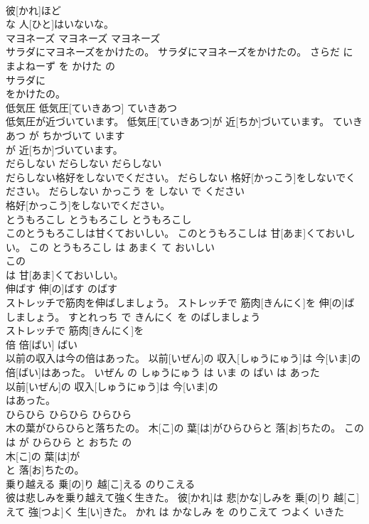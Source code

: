 \documentclass[8pt]{extreport}
\begin{document}
\begin{CJK}{UTF8}{min}
\\	彼[かれ]ほど
\\	な 人[ひと]はいないな。			
\\	マヨネーズ	マヨネーズ	マヨネーズ	
\\	サラダにマヨネーズをかけたの。	サラダにマヨネーズをかけたの。	さらだ に まよねーず を かけた の	
\\	サラダに
\\	をかけたの。			
\\	低気圧	低気圧[ていきあつ]	ていきあつ	
\\	低気圧が近づいています。	低気圧[ていきあつ]が 近[ちか]づいています。	ていきあつ が ちかづいて います	
\\	が 近[ちか]づいています。			
\\	だらしない	だらしない	だらしない	
\\	だらしない格好をしないでください。	だらしない 格好[かっこう]をしないでください。	だらしない かっこう を しない で ください	
\\	格好[かっこう]をしないでください。			
\\	とうもろこし	とうもろこし	とうもろこし	
\\	このとうもろこしは甘くておいしい。	このとうもろこしは 甘[あま]くておいしい。	この とうもろこし は あまく て おいしい	
\\	この
\\	は 甘[あま]くておいしい。			
\\	伸ばす	伸[の]ばす	のばす	
\\	ストレッチで筋肉を伸ばしましょう。	ストレッチで 筋肉[きんにく]を 伸[の]ばしましょう。	すとれっち で きんにく を のばしましょう	
\\	ストレッチで 筋肉[きんにく]を
\\	倍	倍[ばい]	ばい	
\\	以前の収入は今の倍はあった。	以前[いぜん]の 収入[しゅうにゅう]は 今[いま]の 倍[ばい]はあった。	いぜん の しゅうにゅう は いま の ばい は あった	
\\	以前[いぜん]の 収入[しゅうにゅう]は 今[いま]の
\\	はあった。			
\\	ひらひら	ひらひら	ひらひら	
\\	木の葉がひらひらと落ちたの。	木[こ]の 葉[は]がひらひらと 落[お]ちたの。	このは が ひらひら と おちた の	
\\	木[こ]の 葉[は]が
\\	と 落[お]ちたの。			
\\	乗り越える	乗[の]り 越[こ]える	のりこえる	
\\	彼は悲しみを乗り越えて強く生きた。	彼[かれ]は 悲[かな]しみを 乗[の]り 越[こ]えて 強[つよ]く 生[い]きた。	かれ は かなしみ を のりこえて つよく いきた	

\end{CJK}
\end{document}
